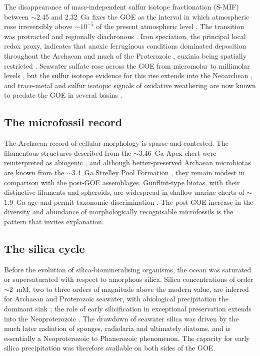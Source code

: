 \documentclass[11pt]{article}
\begin{document}
The disappearance of mass-independent sulfur isotope fractionation (S-MIF) between $\sim$2.45 and
2.32~Ga fixes the GOE as the interval in which atmospheric  rose irreversibly above
$\sim$$10^{-5}$ of the present atmospheric level \citep{Holland2006,Bekker2004,Pavlov2002,Farquhar2000}. The
transition was protracted and regionally diachronous \citep{Lyons2014,Philippot2018}. Iron
speciation, the principal local redox proxy, indicates that anoxic ferruginous conditions dominated
deposition throughout the Archaean and much of the Proterozoic
\citep{Canfield1998,Poulton2005,Poulton2011},
euxinia being spatially restricted \citep{Reinhard2009}. Seawater sulfate rose across the GOE from
micromolar to millimolar levels \citep{Habicht2002,Kah2004,Crowe2014}, but the sulfur isotope
evidence for this rise extends into the Neoarchean \citep{Reinhard2009}, and trace-metal and sulfur
isotopic signals of oxidative weathering are now known to predate the GOE in several basins
\citep{Anbar2007}.

\subsection{The microfossil record}

The Archaean record of cellular morphology is sparse and contested. The filamentous structures
described from the $\sim$3.46~Ga Apex chert \citep{Schopf1993} were reinterpreted as abiogenic
\citep{Brasier2002}, and although better-preserved Archaean microbiotas are known from the
$\sim$3.4~Ga Strelley Pool Formation \citep{Sugitani2010,Delarue2020}, they remain modest in
comparison with the post-GOE assemblages. Gunflint-type biotas, with their distinctive filaments and
spheroids, are widespread in shallow-marine cherts of $\sim$1.9~Ga age and permit taxonomic
discrimination \citep{Javaux2018}. The post-GOE increase in the diversity and abundance of
morphologically recognisable microfossils is the pattern that invites explanation.

\subsection{The silica cycle}

Before the evolution of silica-biomineralising organisms, the ocean was saturated or
supersaturated with respect to amorphous silica. Silica concentrations of order $\sim$2~mM, two to
three orders of magnitude above the modern value, are inferred for Archaean and Proterozoic seawater,
with abiological precipitation the dominant sink \citep{Siever1992,Perry2003}; the role of early
silicification in exceptional preservation extends into the Neoproterozoic \citep{Tarhan2016}. The drawdown of
seawater silica was driven by the much later radiation of sponges, radiolaria and ultimately
diatoms, and is essentially a Neoproterozoic to Phanerozoic phenomenon. The capacity for early
silica precipitation was therefore available on both sides of the GOE.
\end{document}
